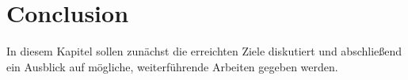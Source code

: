 \chapter{Conclusion}\label{chp:Conclusion}
In diesem Kapitel sollen zunächst die erreichten Ziele diskutiert und abschließend ein Ausblick auf mögliche, weiterführende Arbeiten gegeben werden.
